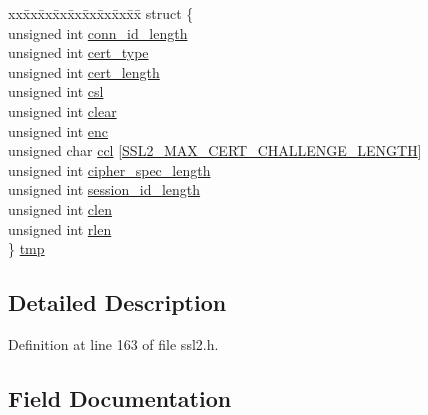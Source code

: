 \begin{DoxyCompactItemize}
\begin{tabbing}
\end{tabbing}\item 
\begin{tabbing}
xx\=xx\=xx\=xx\=xx\=xx\=xx\=xx\=xx\=\kill
struct \{\\
\>unsigned int \hyperlink{structssl2__state__st_aac92d44b1ad47635777ede390343bd11}{conn\_id\_length}\\
\>unsigned int \hyperlink{structssl2__state__st_a2bb1c4376b0c853c73d46703160f6c88}{cert\_type}\\
\>unsigned int \hyperlink{structssl2__state__st_a2583fe8e969237d09f449af15d6a3c06}{cert\_length}\\
\>unsigned int \hyperlink{structssl2__state__st_a2c7f3ea29ea669ae52d434ccc6046b9c}{csl}\\
\>unsigned int \hyperlink{structssl2__state__st_a9446900a3977792359b655add6754a1f}{clear}\\
\>unsigned int \hyperlink{structssl2__state__st_a351b336dde67c7824f93553242992db7}{enc}\\
\>unsigned char \hyperlink{structssl2__state__st_a6bfe609d1289aa450650310810938b33}{ccl} \mbox{[}\hyperlink{ssl_2ssl2_8h_a3fb0a83975dadfe0928cd1752b518215}{SSL2\_MAX\_CERT\_CHALLENGE\_LENGTH}\mbox{]}\\
\>unsigned int \hyperlink{structssl2__state__st_aeb38423853460bf1c28f72ddd06a54b3}{cipher\_spec\_length}\\
\>unsigned int \hyperlink{structssl2__state__st_aef3d2a4622055ed0cfb19d9d8f696ec2}{session\_id\_length}\\
\>unsigned int \hyperlink{structssl2__state__st_a6d09b72841914282a450ed092dce6141}{clen}\\
\>unsigned int \hyperlink{structssl2__state__st_a9749b9b1e812b509dfda17cb1de9296b}{rlen}\\
\} \hyperlink{structssl2__state__st_a0d3df667485ab6cea92e48c5f0f17d86}{tmp}\\

\end{tabbing}\end{DoxyCompactItemize}


\subsection{Detailed Description}


Definition at line 163 of file ssl2.\+h.



\subsection{Field Documentation}
